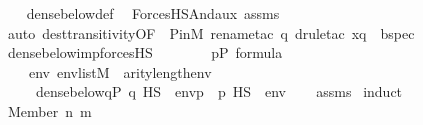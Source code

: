 \begin{isabellebody}
%
\isadelimproof
\ \ %
\endisadelimproof
%
\isatagproof
{}\isamarkupfalse%
\ dense{\isacharunderscore}{\kern0pt}below{\isacharunderscore}{\kern0pt}def\ \isamarkupfalse%
\ ForcesHS{\isacharunderscore}{\kern0pt}And{\isacharunderscore}{\kern0pt}aux\ assms\isanewline
\ \ \ \ \isamarkupfalse%
\ {\isacharparenleft}{\kern0pt}auto\ dest{\isacharcolon}{\kern0pt}transitivity{\isacharbrackleft}{\kern0pt}OF\ {\isacharunderscore}{\kern0pt}\ P{\isacharunderscore}{\kern0pt}in{\isacharunderscore}{\kern0pt}M{\isacharbrackright}{\kern0pt}{\isacharsemicolon}{\kern0pt}\ rename{\isacharunderscore}{\kern0pt}tac\ q{\isacharsemicolon}{\kern0pt}\ drule{\isacharunderscore}{\kern0pt}tac\ x{\isacharequal}{\kern0pt}q\ \ bspec{\isacharparenright}{\kern0pt}{\isacharplus}{\kern0pt}%
\endisatagproof
{\isafoldproof}%
%
\isadelimproof
\isanewline
%
\endisadelimproof
\isanewline
{}\isamarkupfalse%
\ dense{\isacharunderscore}{\kern0pt}below{\isacharunderscore}{\kern0pt}imp{\isacharunderscore}{\kern0pt}forcesHS{\isacharcolon}{\kern0pt}\isanewline
\ \ \ \isanewline
\ \ \ \ {\isachardoublequoteopen}p{\isasymin}P{\isachardoublequoteclose}\ {\isachardoublequoteopen}{\isasymphi}{\isasymin}formula{\isachardoublequoteclose}\isanewline
\ \ \isanewline
\ \ \ \ {\isachardoublequoteopen}{\isasymAnd}env{\isachardot}{\kern0pt}\ env{\isasymin}list{\isacharparenleft}{\kern0pt}M{\isacharparenright}{\kern0pt}\ {\isasymLongrightarrow}\ arity{\isacharparenleft}{\kern0pt}{\isasymphi}{\isacharparenright}{\kern0pt}{\isasymle}length{\isacharparenleft}{\kern0pt}env{\isacharparenright}{\kern0pt}\ {\isasymLongrightarrow}\isanewline
\ \ \ \ \ dense{\isacharunderscore}{\kern0pt}below{\isacharparenleft}{\kern0pt}{\isacharbraceleft}{\kern0pt}q{\isasymin}P{\isachardot}{\kern0pt}\ {\isacharparenleft}{\kern0pt}q\ {\isasymtturnstile}HS\ {\isasymphi}\ env{\isacharparenright}{\kern0pt}{\isacharbraceright}{\kern0pt}{\isacharcomma}{\kern0pt}p{\isacharparenright}{\kern0pt}\ {\isasymLongrightarrow}\ {\isacharparenleft}{\kern0pt}p\ {\isasymtturnstile}HS\ {\isasymphi}\ env{\isacharparenright}{\kern0pt}{\isachardoublequoteclose}\isanewline
%
\isadelimproof
\ \ %
\endisadelimproof
%
\isatagproof
{}\isamarkupfalse%
\ assms{\isacharparenleft}{\kern0pt}{}{\isacharparenright}{\kern0pt}\isanewline
{}\isamarkupfalse%
\ {\isacharparenleft}{\kern0pt}induct{\isacharparenright}{\kern0pt}\isanewline
\ \ \isamarkupfalse%
\ {\isacharparenleft}{\kern0pt}Member\ n\ m{\isacharparenright}{\kern0pt}\isanewline

\end{isabellebody}
